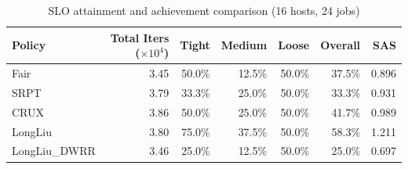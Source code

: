 \begin{table}[t]
\centering
\caption{SLO attainment and achievement comparison (16 hosts, 24 jobs)}
\label{tab:slo_16host}
\begin{tabular}{l|r|r|r|r|r|r}
\hline
Policy & Total Iters ($\times 10^4$) & Tight & Medium & Loose & Overall & SAS \\
\hline
Fair & 3.45 & 50.0\% & 12.5\% & 50.0\% & 37.5\% & 0.896 \\
SRPT & 3.79 & 33.3\% & 25.0\% & 50.0\% & 33.3\% & 0.931 \\
CRUX & 3.86 & 50.0\% & 25.0\% & 50.0\% & 41.7\% & 0.989 \\
LongLiu & 3.80 & 75.0\% & 37.5\% & 50.0\% & 58.3\% & 1.211 \\
LongLiu_DWRR & 3.46 & 25.0\% & 12.5\% & 50.0\% & 25.0\% & 0.697 \\
\hline
\end{tabular}
\end{table}
